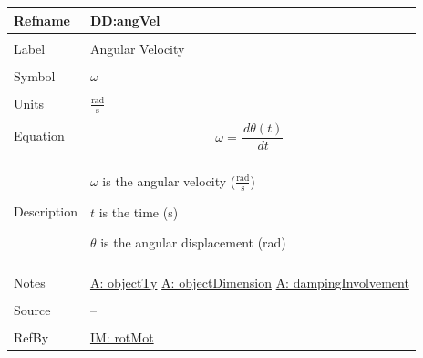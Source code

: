 \documentclass[12pt]{article}
\begin{document}
\noindent \begin{minipage}{\textwidth}
\begin{tabular}{>{\raggedright}p{}>{\raggedright\arraybackslash}p{}}
\toprule \textbf{Refname} & \textbf{DD:angVel}
\label{DD:angVel}
\\ \midrule \\
Label & Angular Velocity
\\ \midrule \\
Symbol & $ω$
\\ \midrule \\
Units & $\frac{\text{rad}}{\text{s}}$
\\ \midrule \\
Equation & \begin{displaymath}
           ω=\frac{\,dθ\left(t\right)}{\,dt}
           \end{displaymath}
\\ \midrule \\
Description & \begin{symbDescription}
              \item{$ω$ is the angular velocity ($\frac{\text{rad}}{\text{s}}$)}
              \item{$t$ is the time (s)}
              \item{$θ$ is the angular displacement (rad)}
              \end{symbDescription}
\\ \midrule \\
Notes & \hyperref[assumpOT]{A: objectTy}
        \hyperref[assumpOD]{A: objectDimension}
        \hyperref[assumpDI]{A: dampingInvolvement}
\\ \midrule \\
Source & --
\\ \midrule \\
RefBy & \hyperref[IM:rotMot]{IM: rotMot}
\\ \bottomrule
\end{tabular}
\end{minipage}
\par~
\end{document}
